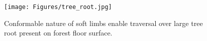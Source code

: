 \begin{figure}[!t]
    \centering
    \texttt{[image: Figures/tree\_root.jpg]}
    \caption{Conformable nature of soft limbs enable traversal over large tree root present on forest floor surface.}
    \label{fig:tree}
\end{figure}






